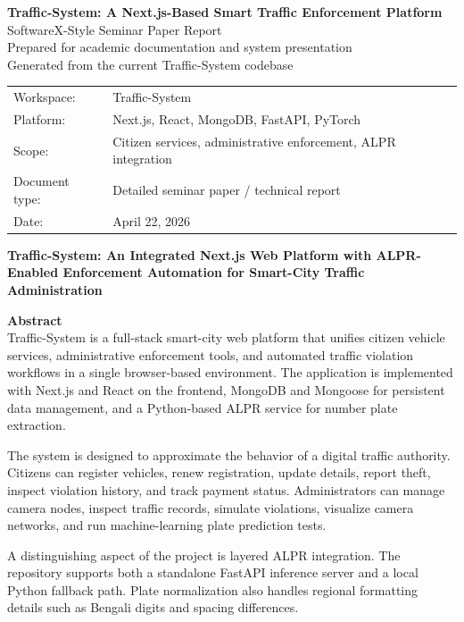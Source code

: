 \documentclass[12pt]{article}
\begin{document}
\begin{titlepage}
\centering
{\LARGE \textbf{Traffic-System: A Next.js-Based Smart Traffic Enforcement Platform}\\[0.6cm]}
{\large SoftwareX-Style Seminar Paper Report\\[1.2cm]}
{\normalsize Prepared for academic documentation and system presentation\\Generated from the current Traffic-System codebase\\[1.2cm]}

\vfill

\begin{tabular}{ll}
Workspace: & Traffic-System \\
Platform: & Next.js, React, MongoDB, FastAPI, PyTorch \\
Scope: & Citizen services, administrative enforcement, ALPR integration \\
Document type: & Detailed seminar paper / technical report \\
Date: & April 22, 2026 \\
\end{tabular}

\vfill
\end{titlepage}

\begin{center}
{\Large \textbf{Traffic-System: An Integrated Next.js Web Platform with ALPR-Enabled Enforcement Automation for Smart-City Traffic Administration}}
\end{center}

\vspace{0.5cm}
\noindent\textbf{Abstract}\\
Traffic-System is a full-stack smart-city web platform that unifies citizen vehicle services, administrative enforcement tools, and automated traffic violation workflows in a single browser-based environment. The application is implemented with Next.js and React on the frontend, MongoDB and Mongoose for persistent data management, and a Python-based ALPR service for number plate extraction.

The system is designed to approximate the behavior of a digital traffic authority. Citizens can register vehicles, renew registration, update details, report theft, inspect violation history, and track payment status. Administrators can manage camera nodes, inspect traffic records, simulate violations, visualize camera networks, and run machine-learning plate prediction tests.

A distinguishing aspect of the project is layered ALPR integration. The repository supports both a standalone FastAPI inference server and a local Python fallback path. Plate normalization also handles regional formatting details such as Bengali digits and spacing differences.
\end{document}
